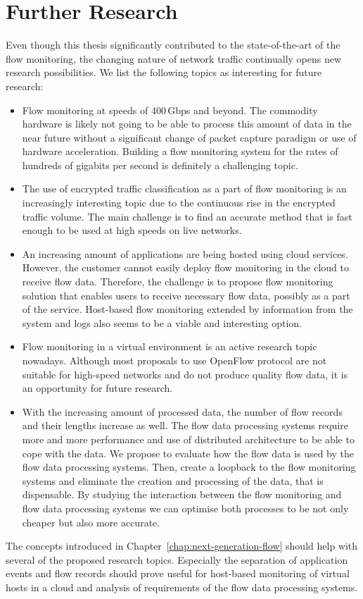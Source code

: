 \section{Further Research}

Even though this thesis significantly contributed to the state-of-the-art of the flow monitoring, the changing nature of network traffic continually opens new research possibilities. We list the following topics as interesting for future research:

\begin{itemize}
  \item Flow monitoring at speeds of 400\,Gbps and beyond. The commodity hardware is likely not going to be able to process this amount of data in the near future without a significant change of packet capture paradigm or use of hardware acceleration. Building a flow monitoring system for the rates of hundreds of gigabits per second is definitely a challenging topic.
  \item The use of encrypted traffic classification as a part of flow monitoring is an increasingly interesting topic due to the continuous rise in the encrypted traffic volume. The main challenge is to find an accurate method that is fast enough to be used at high speeds on live networks.
  \item An increasing amount of applications are being hosted using cloud services. However, the customer cannot easily deploy flow monitoring in the cloud to receive flow data. Therefore, the challenge is to propose flow monitoring solution that enables users to receive necessary flow data, possibly as a part of the service. Host-based flow monitoring extended by information from the system and logs also seems to be a viable and interesting option.
  \item Flow monitoring in a virtual environment is an active research topic nowadays. Although most proposals to use OpenFlow protocol are not suitable for high-speed networks and do not produce quality flow data, it is an opportunity for future research.
  \item With the increasing amount of processed data, the number of flow records and their lengths increase as well. The flow data processing systems require more and more performance and use of distributed architecture to be able to cope with the data. We propose to evaluate how the flow data is used by the flow data processing systems. Then, create a loopback to the flow monitoring systems and eliminate the creation and processing of the data, that is dispensable. By studying the interaction between the flow monitoring and flow data processing systems we can optimise both processes to be not only cheaper but also more accurate.
\end{itemize}

The concepts introduced in Chapter~\ref{chap:next-generation-flow} should help with several of the proposed research topics. Especially the separation of application events and flow records should prove useful for host-based monitoring of virtual hosts in a cloud and analysis of requirements of the flow data processing systems.